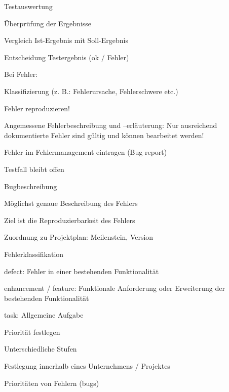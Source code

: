 \documentclass[a4paper]{article}
\begin{document}
\begin{multicols}{3}
  Testauswertung
  \begin{itemize*}
    \item Überprüfung der Ergebnisse
    \item Vergleich Ist-Ergebnis mit Soll-Ergebnis
    \item Entscheidung Testergebnis (ok / Fehler)
    \item Bei Fehler:
          \begin{itemize*}
            \item Klassifizierung (z. B.: Fehlerursache, Fehlerschwere etc.)
            \item Fehler reproduzieren!
            \item Angemessene Fehlerbeschreibung und –erläuterung: Nur ausreichend dokumentierte Fehler sind gültig und können bearbeitet werden!
            \item Fehler im Fehlermanagement eintragen (Bug report)
            \item Testfall bleibt offen
          \end{itemize*}
  \end{itemize*}

  Bugbeschreibung
  \begin{itemize*}
    \item Möglichst genaue Beschreibung des Fehlers
    \item Ziel ist die Reproduzierbarkeit des Fehlers
    \item Zuordnung zu Projektplan: Meilenstein, Version
    \item Fehlerklassifikation
          \begin{itemize*}
            \item defect: Fehler in einer bestehenden Funktionalität
            \item enhancement / feature: Funktionale Anforderung oder Erweiterung der bestehenden Funktionalität
            \item task: Allgemeine Aufgabe
          \end{itemize*}
    \item Priorität festlegen
          \begin{itemize*}
            \item Unterschiedliche Stufen
            \item Festlegung innerhalb eines Unternehmens / Projektes
          \end{itemize*}
    \item Prioritäten von Fehlern (bugs)
  \end{itemize*}


\end{multicols}
\end{document}

